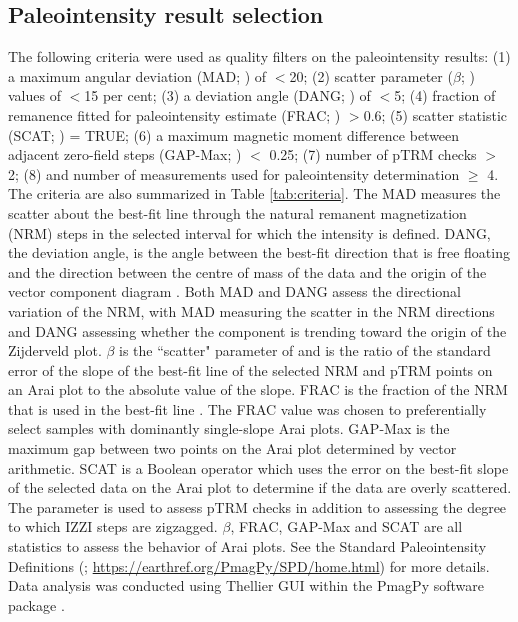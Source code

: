 \documentclass[draft]{agujournal2019}
\begin{document}

\subsection*{Paleointensity result selection}
The following criteria were used as quality filters on the paleointensity results: (1) a maximum angular deviation (MAD; ) of $<$20\textdegree; (2) scatter parameter ($\beta$; ) values of $<$15 per cent; (3) a deviation angle (DANG; ) of $<$5\textdegree; (4) fraction of remanence fitted for paleointensity estimate (FRAC; ) $>$0.6; (5) scatter statistic (SCAT; ) = TRUE; (6) a maximum magnetic moment difference between adjacent zero-field steps (GAP-Max; ) $<$ 0.25; (7) number of pTRM checks $>$ 2; (8) and number of measurements used for paleointensity determination $\geq$ 4. The criteria are also summarized in Table \ref{tab:criteria}. The MAD measures the scatter about the best-fit line through the natural remanent magnetization (NRM) steps in the selected interval for which the intensity is defined. DANG, the deviation angle, is the angle between the best-fit direction that is free floating and the direction between the centre of mass of the data and the origin of the vector component diagram \cite{Tauxe2004a}. Both MAD and DANG assess the directional variation of the NRM, with MAD measuring the scatter in the NRM directions and DANG assessing whether the component is trending toward the origin of the Zijderveld plot. $\beta$ is the ``scatter" parameter of  and is the ratio of the standard error of the slope of the best-fit line of the selected NRM and pTRM points on an Arai plot to the absolute value of the slope. FRAC is the fraction of the NRM that is used in the best-fit line \cite{Shaar2013a}. The FRAC value was chosen to preferentially select samples with dominantly single-slope Arai plots. GAP-Max is the maximum gap between two points on the Arai plot determined by vector arithmetic. SCAT is a Boolean operator which uses the error on the best-fit slope of the selected data on the Arai plot to determine if the data are overly scattered. The parameter is used to assess pTRM checks in addition to assessing the degree to which IZZI steps are zigzagged. $\beta$, FRAC, GAP-Max and SCAT are all statistics to assess the behavior of Arai plots. See the Standard Paleointensity Definitions (; \url{https://earthref.org/PmagPy/SPD/home.html}) for more details. Data analysis was conducted using Thellier GUI \cite{Shaar2013a} within the PmagPy software package \cite{Tauxe2016a}.
\end{document}
